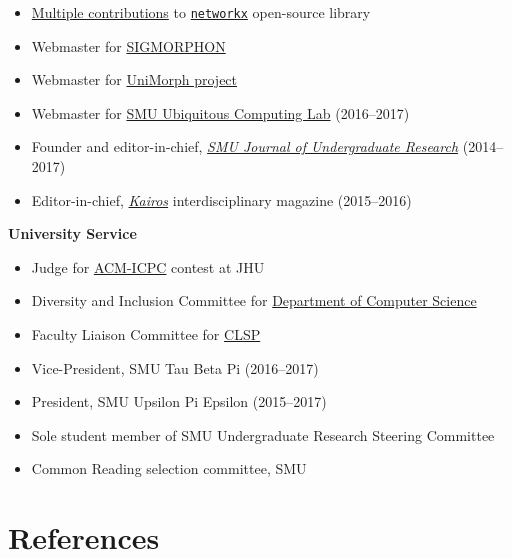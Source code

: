 \documentclass[margin, 10pt]{res} %
\newcommand{\clsp}{\href{https://www.clsp.jhu.edu}{CLSP}}
\begin{document}
\begin{resume}
\begin{itemize}
\item \href{https://github.com/networkx/networkx/pulls?utf8=?&q=is\%3Apr+author\%3Aaryamccarthy+}{Multiple contributions} to \href{http://networkx.github.io}{\texttt{networkx}} open-source library
\item Webmaster for \href{https://sigmorphon.github.io}{SIGMORPHON}
\item Webmaster for \href{https://unimorph.github.io}{UniMorph project}
\item Webmaster for \href{http://ubicomp.lyle.smu.edu}{SMU Ubiquitous Computing Lab} (2016--2017)
\item Founder and editor-in-chief, \href{https://smuresearch.wordpress.com/journal/}{\emph{SMU Journal of Undergraduate Research}} (2014--2017)
\item Editor-in-chief, \href{https://smuresearch.wordpress.com/kairos/}{\emph{Kairos}} interdisciplinary magazine (2015--2016)
\end{itemize}


\textbf{University Service}

\begin{itemize}
\item Judge for \href{https://en.wikipedia.org/wiki/ACM_International_Collegiate_Programming_Contest}{ACM-ICPC} contest at JHU
\item Diversity and Inclusion Committee for \href{https://www.cs.jhu.edu}{Department of Computer Science}
\item Faculty Liaison Committee for \clsp
\item Vice-President, SMU Tau Beta Pi (2016--2017)
\item President, SMU Upsilon Pi Epsilon (2015--2017)
\item Sole student member of SMU Undergraduate Research Steering Committee
\item Common Reading selection committee, SMU
\end{itemize}


\section{References}


\end{resume}
\end{document}
